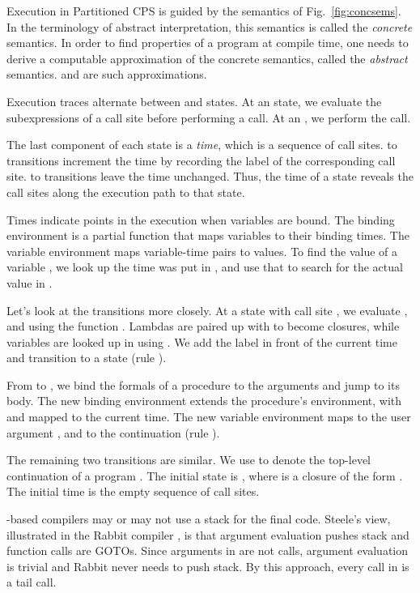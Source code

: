 \documentclass{LMCS}
\theoremstyle{definition} \newtheorem{property}[thm]{Property}
\begin{document}
\noindent Execution in Partitioned CPS is guided by the semantics of 
Fig.~\ref{fig:concsems}.
In the terminology of abstract interpretation, this semantics is called the
\emph{concrete} semantics.
In order to find properties of a program at compile time, one needs to derive a
computable approximation of the concrete semantics, called the \emph{abstract}
semantics.
\cfat{} and \kcfa{} are such approximations.

Execution traces alternate between \deval{} and \dapply{} states.
At an \deval{} state, we evaluate the subexpressions of a call site before
performing a call.
At an \dapply, we perform the call.

The last component of each state is a \emph{time}, which is a sequence of 
call sites.
\deval{} to \dapply{} transitions increment the time by recording the label
of the corresponding call site.
\dapply{} to \deval{} transitions leave the time unchanged.
Thus, the time  of a state reveals the call sites along the execution path
to that state.

Times indicate points in the execution when variables are bound.
The binding environment \cbenv{} is a partial function that maps variables 
to their binding times.
The variable environment \cvenv{} maps variable-time pairs to values.
To find the value of a variable , we look up the time  was put in \cbenv, 
and use that to search for the actual value in \cvenv.

Let's look at the transitions more closely.
At a \dueval{} state with call site \ucall, we evaluate ,  and 
using the function \cbigaNA.
Lambdas are paired up with \cbenv{} to become closures, while variables are 
looked up in \cvenv{} using \cbenv.
We add the label  in front of the current time and transition to a 
\duapply{} state (rule ).

From \duapply{} to \deval{}, we bind the formals of a procedure 
\tuple{\denot{\ulam}, \cbenv} to the arguments and jump to its body.
The new binding environment  extends the procedure's environment, with
 and  mapped to the current time.
The new variable environment  maps  to the user argument 
\cuarg, and  to the continuation \ccarg{} (rule ).

The remaining two transitions are similar.
We use \haltcont{} to denote the top-level continuation of a program \mprog.
The initial state \initstate{} is 
, 
where  is a closure of the form .
The initial time is the empty sequence of call sites.

\cps{}-based compilers may or may not use a stack for the final code.
Steele's view, illustrated in the Rabbit compiler 
\cite{masters/mit/78/steel/rabbit}, is that argument evaluation pushes stack and
function calls are {\small GOTO}s.
Since arguments in \cps{} are not calls,
argument evaluation is trivial and Rabbit never needs to push stack.
By this approach, every call in \cps{} is a tail call.
\end{document}
